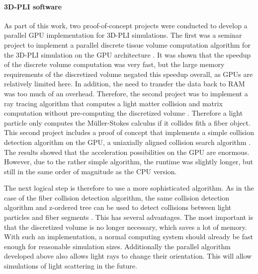 \paragraph{\ac{3D-PLI} software}
% 
As part of this work, two proof-of-concept projects were conducted to develop a parallel GPU implementation for \ac{3D-PLI} simulations.
The first was a seminar project to implement a parallel discrete tissue volume computation algorithm for the \ac{3D-PLI} simulation on the \ac{GPU} architecture \cite{Kobusch:Seminar}.
It was shown that the speedup of the discrete volume computation was very fast, but the large memory requirements of the discretized volume negated this speedup overall, as \acp{GPU} are relatively limited here.
In addition, the need to transfer the data back to \ac{RAM} was too much of an overhead.
Therefore, the second project was to implement a ray tracing algorithm that computes a light matter collision and matrix computation without pre-computing the discretized volume \cite{Kobusch:887783}.
Therefore a light particle only computes the M\"{u}ller-Stokes calculus if it collides fith a fiber object.
This second project includes a proof of concept that implements a simple collision detection algorithm on the \ac{GPU}, a uniaxially aligned collision search algorithm \cite{Karras2012}.
The results showed that the acceleration possibilities on the \ac{GPU} are enormous.
However, due to the rather simple algorithm, the runtime was slightly longer, but still in the same order of magnitude as the \ac{CPU} version.
\par
% 
The next logical step is therefore to use a more sophisticated algorithm.
As in the case of the fiber collision detection algorithm, the same collision detection algorithm and z-ordered tree can be used to detect collisions between light particles and fiber segments \cite{Karras2012}.
This has several advantages.
The most important is that the discretized volume is no longer necessary, which saves a lot of memory.
With such an implementation, a normal computing system should already be fast enough for reasonable simulation sizes.
Additionally the parallel algorithm developed above also allows light rays to change their orientation.
This will allow simulations of light scattering in the future.
% 
% 
% 
